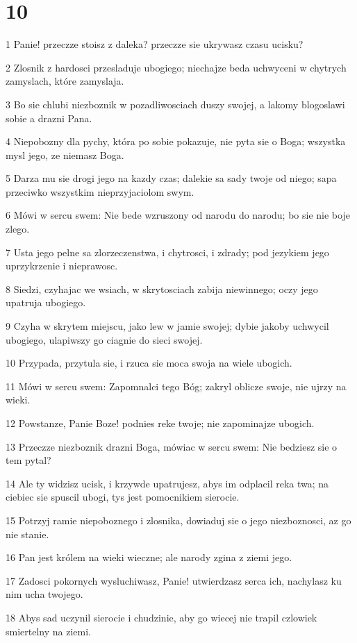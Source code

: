 \chapter{10}

\par 1 Panie! przeczze stoisz z daleka? przeczze sie ukrywasz czasu ucisku?
\par 2 Zlosnik z hardosci przesladuje ubogiego; niechajze beda uchwyceni w chytrych zamyslach, które zamyslaja.
\par 3 Bo sie chlubi niezboznik w pozadliwosciach duszy swojej, a lakomy blogoslawi sobie a drazni Pana.
\par 4 Niepobozny dla pychy, która po sobie pokazuje, nie pyta sie o Boga; wszystka mysl jego, ze niemasz Boga.
\par 5 Darza mu sie drogi jego na kazdy czas; dalekie sa sady twoje od niego; sapa przeciwko wszystkim nieprzyjaciolom swym.
\par 6 Mówi w sercu swem: Nie bede wzruszony od narodu do narodu; bo sie nie boje zlego.
\par 7 Usta jego pelne sa zlorzeczenstwa, i chytrosci, i zdrady; pod jezykiem jego uprzykrzenie i nieprawosc.
\par 8 Siedzi, czyhajac we wsiach, w skrytosciach zabija niewinnego; oczy jego upatruja ubogiego.
\par 9 Czyha w skrytem miejscu, jako lew w jamie swojej; dybie jakoby uchwycil ubogiego, ulapiwszy go ciagnie do sieci swojej.
\par 10 Przypada, przytula sie, i rzuca sie moca swoja na wiele ubogich.
\par 11 Mówi w sercu swem: Zapomnalci tego Bóg; zakryl oblicze swoje, nie ujrzy na wieki.
\par 12 Powstanze, Panie Boze! podnies reke twoje; nie zapominajze ubogich.
\par 13 Przeczze niezboznik drazni Boga, mówiac w sercu swem: Nie bedziesz sie o tem pytal?
\par 14 Ale ty widzisz ucisk, i krzywde upatrujesz, abys im odplacil reka twa; na ciebiec sie spuscil ubogi, tys jest pomocnikiem sierocie.
\par 15 Potrzyj ramie niepoboznego i zlosnika, dowiaduj sie o jego niezboznosci, az go nie stanie.
\par 16 Pan jest królem na wieki wieczne; ale narody zgina z ziemi jego.
\par 17 Zadosci pokornych wysluchiwasz, Panie! utwierdzasz serca ich, nachylasz ku nim ucha twojego.
\par 18 Abys sad uczynil sierocie i chudzinie, aby go wiecej nie trapil czlowiek smiertelny na ziemi.


